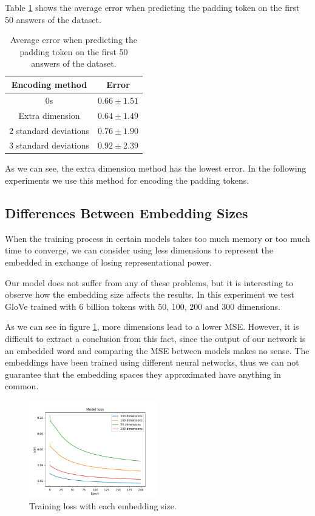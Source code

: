 \documentclass[]{article}
\begin{document}
	Table \ref{t:tokens} shows the average error when predicting the padding token on the first 50 answers of the dataset.
	
	\begin{table}[H]
		\centering
		\begin{tabular}{@{}cc@{}}
			\toprule
			Encoding method		  & Error \\ \midrule
			0s                    & $0.66 \pm 1.51$              \\
			Extra dimension       & $0.64 \pm 1.49$              \\
			2 standard deviations & $0.76 \pm 1.90$              \\
			3 standard deviations & $0.92 \pm 2.39$              \\ \bottomrule
		\end{tabular}
		\caption{Average error when predicting the padding token on the first 50 answers of the dataset.}
		\label{t:tokens}
	\end{table}
	
	As we can see, the extra dimension method has the lowest error. In the following experiments we use this method for encoding the padding tokens.
	
	\subsection{Differences Between Embedding Sizes}
	
	When the training process in certain models takes too much memory or too much time to converge, we can consider using less dimensions to represent the embedded in exchange of losing representational power.
	
	Our model does not suffer from any of these problems, but it is interesting to observe how the embedding size affects the results. In this experiment we test GloVe trained with 6 billion tokens with 50, 100, 200 and 300 dimensions.
	
	As we can see in figure \ref{f:sizes}, more dimensions lead to a lower MSE. However, it is difficult to extract a conclusion from this fact, since the output of our network is an embedded word and comparing the MSE between models makes no sense. The embeddings have been trained using different neural networks, thus we can not guarantee that the embedding spaces they approximated have anything in common.
	
	\begin{figure}[H]
		\centering
		\includegraphics[width=0.5\textwidth]{sizes}
		\caption{Training loss with each embedding size.}
		\label{f:sizes}
	\end{figure}
	
\end{document}
